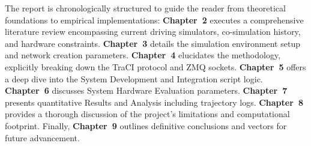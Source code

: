 The report is chronologically structured to guide the reader from theoretical foundations to empirical implementations:
\textbf{Chapter~2} executes a comprehensive literature review encompassing current driving simulators, co-simulation history, and hardware constraints. \textbf{Chapter~3} details the simulation environment setup and network creation parameters. \textbf{Chapter~4} elucidates the methodology, explicitly breaking down the TraCI protocol and ZMQ sockets. \textbf{Chapter~5} offers a deep dive into the System Development and Integration script logic. \textbf{Chapter~6} discusses System Hardware Evaluation parameters. \textbf{Chapter~7} presents quantitative Results and Analysis including trajectory logs. \textbf{Chapter~8} provides a thorough discussion of the project’s limitations and computational footprint. Finally, \textbf{Chapter~9} outlines definitive conclusions and vectors for future advancement.

